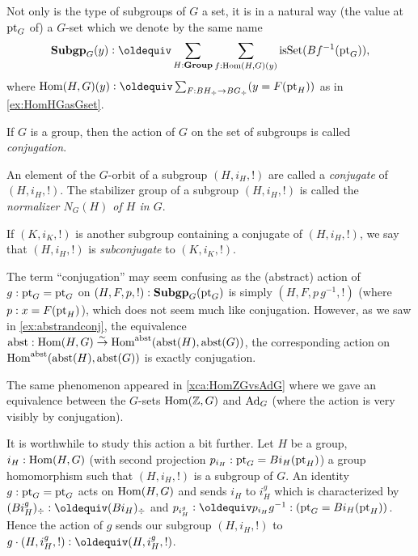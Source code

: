 Not only is the type of subgroups  of $G$ a set, it is in a natural way (the value at ${\mathord{\mathrm{pt}}}_G$ of) a $G$-set which we denote by the same name
$$%
\typesubgroup_G(y)\defequi \sum_{H:\typegroup}\sum_{f:\Hom(H,G)(y)}\isset(Bf^{-1}(\pt_G)),$$
where $\Hom(H,G)(y)\defequi\sum_{F:BH_\div\to BG_\div}(y=F(\pt_H))$ as in \cref{ex:HomHGasGset}.  
\begin{definition}
  \label{def:conjactonsubgroups}\label{def:normalizer}
  If $G$ is a group, then the action of $G$ on the set of subgroups is called \emph{conjugation}.  

An element of the $G$-orbit of a subgroup $(H,i_H,!)$ are called a \emph{conjugate} of $(H,i_H,!)$.   The stabilizer group of a subgroup $(H,i_H,!)$ is called the \emph{normalizer $N_G(H)$ of $H$ in $G$}.

If $(K,i_K,!)$ is another subgroup containing a conjugate of $(H,i_H,!)$, we say that $(H,i_H,!)$ is \emph{subconjugate} to $(K,i_K,!)$.
\end{definition}
\begin{remark}
  \label{rem:whyconjugate}
  The term ``conjugation'' may seem confusing as the (abstract) action of $g:{\mathord{\mathrm{pt}}}_G={\mathord{\mathrm{pt}}}_G$ on $(H,F,p,!):\mathbf{Subgp}_G({\mathord{\mathrm{pt}}}_G)$ is simply $(H,F,p\,g^{-1},!)$ (where $p:x=F({\mathord{\mathrm{pt}}}_H)$), which does not seem much like conjugation.  However, as we saw in \cref{ex:abstrandconj}, the equivalence $\mathrm{abst}:\mathrm{Hom}(H,G)\overset\sim\to\mathrm{Hom}^{\mathrm{abst}}(\mathrm{abst}(H),\mathrm{abst}(G))$, the corresponding action on $\mathrm{Hom}^{\mathrm{abst}}(\mathrm{abst}(H),\mathrm{abst}(G))$ is exactly conjugation.  

The same phenomenon appeared in \cref{xca:HomZGvsAdG} where we gave an equivalence between the $G$-sets $\mathrm{Hom}(\mathbb{Z},G)$ and $\mathrm{Ad}_G$ (where the action is very visibly by conjugation).
\end{remark}

\begin{remark}
  \label{rem:conjactiononsubgroups}
  It is worthwhile to study this action a bit further.  Let $H$ be a group, $i_H:\mathrm{Hom}(H,G)$ (with second projection $p_{i_H}:{\mathord{\mathrm{pt}}}_G=Bi_{H}({\mathord{\mathrm{pt}}}_H)$) a group homomorphism such that $(H,i_H,!)$ is a subgroup of $G$.  An identity $g:{\mathord{\mathrm{pt}}}_G={\mathord{\mathrm{pt}}}_G$ acts on $\mathrm{Hom}(H,G)$ and sends $i_H$ to $i^g_H$ which is characterized by $(Bi^g_H)_\div\defequi(Bi_H)_\div$ and $p_{i^g_H}\defequi p_{i_H}g^{-1}:(\pt_G=Bi_H(\pt_H))$.  Hence the action of $g$ sends our subgroup $(H,i_H,!)$ to $g\cdot(H,i^g_H,!)\defequi (H,i^g_H,!)$.



\end{remark}



